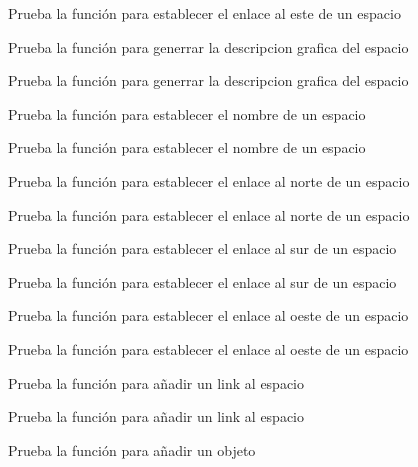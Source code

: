 \begin{DoxyRefList}
Prueba la función para establecer el enlace al este de un espacio  
\item[\label{test__test000072}%
\Hypertarget{test__test000072}%
Member \hyperlink{space__test_8c_af40c7a664b529a39c3d98dca3d0af708}{test2\+\_\+space\+\_\+set\+\_\+gdesc} ()]Prueba la función para generrar la descripcion grafica del espacio 

Prueba la función para generrar la descripcion grafica del espacio  
\item[\label{test__test000029}%
\Hypertarget{test__test000029}%
Member \hyperlink{space__test_8c_a5a868ba017602ba6b58447cb394e81a6}{test2\+\_\+space\+\_\+set\+\_\+name} ()]Prueba la función para establecer el nombre de un espacio 

Prueba la función para establecer el nombre de un espacio  
\item[\label{test__test000032}%
\Hypertarget{test__test000032}%
Member \hyperlink{space__test_8c_a3bc7fe26c1e36ffd195099a9983206e1}{test2\+\_\+space\+\_\+set\+\_\+north} ()]Prueba la función para establecer el enlace al norte de un espacio 

Prueba la función para establecer el enlace al norte de un espacio  
\item[\label{test__test000035}%
\Hypertarget{test__test000035}%
Member \hyperlink{space__test_8c_ac9f950741f12ccfcc5ad5d9e71d3d90a}{test2\+\_\+space\+\_\+set\+\_\+south} ()]Prueba la función para establecer el enlace al sur de un espacio 

Prueba la función para establecer el enlace al sur de un espacio  
\item[\label{test__test000041}%
\Hypertarget{test__test000041}%
Member \hyperlink{space__test_8c_aa51b05ffd99b7bbd8f2dfc23c8f85870}{test2\+\_\+space\+\_\+set\+\_\+west} ()]Prueba la función para establecer el enlace al oeste de un espacio 

Prueba la función para establecer el enlace al oeste de un espacio  
\item[\label{test__test000070}%
\Hypertarget{test__test000070}%
Member \hyperlink{space__test_8c_a9f0137a280d792279af416a256d90a5b}{test3\+\_\+space\+\_\+add\+\_\+link} ()]Prueba la función para añadir un link al espacio 

Prueba la función para añadir un link al espacio  
\item[\label{test__test000064}%
\Hypertarget{test__test000064}%
Member \hyperlink{space__test_8c_ac6abb97e2aa0f1dd44d47732adcf6329}{test3\+\_\+space\+\_\+add\+\_\+object} ()]Prueba la función para añadir un objeto 


\end{DoxyRefList}
